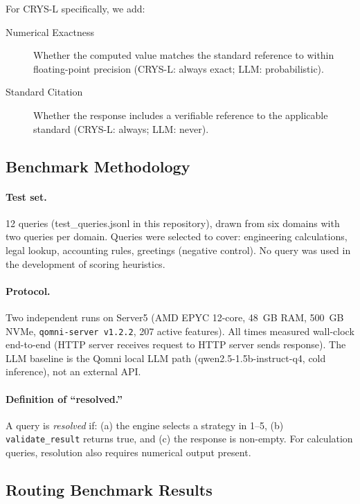 \documentclass[12pt,a4paper]{article}
\begin{document}
For CRYS-L specifically, we add:
\begin{description}
  \item[Numerical Exactness] Whether the computed value matches the standard
    reference to within floating-point precision (CRYS-L: always exact;
    LLM: probabilistic).
  \item[Standard Citation] Whether the response includes a verifiable reference
    to the applicable standard (CRYS-L: always; LLM: never).
\end{description}

\subsection{Benchmark Methodology}

\paragraph{Test set.}
12 queries (test\_queries.jsonl in this repository), drawn from six domains
with two queries per domain. Queries were selected to cover: engineering
calculations, legal lookup, accounting rules, greetings (negative control).
No query was used in the development of scoring heuristics.

\paragraph{Protocol.}
Two independent runs on Server5 (AMD EPYC 12-core, 48~GB RAM, 500~GB NVMe,
\texttt{qomni-server v1.2.2}, 207 active features).
All times measured wall-clock end-to-end (HTTP server receives request to
HTTP server sends response). The LLM baseline is the Qomni local LLM path
(qwen2.5-1.5b-instruct-q4, cold inference), not an external API.

\paragraph{Definition of ``resolved.''}
A query is \emph{resolved} if: (a) the engine selects a strategy in 1--5,
(b) \texttt{validate\_result} returns true, and (c) the response is non-empty.
For calculation queries, resolution also requires numerical output present.

\subsection{Routing Benchmark Results}
\end{document}
